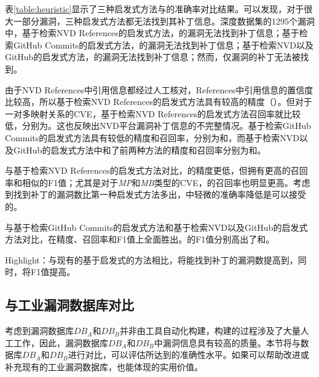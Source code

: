 表\ref{table:heuristic}显示了三种启发式方法与\tool 的准确率对比结果。可以发现，对于很大一部分漏洞，三种启发式方法都无法找到其补丁信息。深度数据集的1295个漏洞中，基于检索NVD References的启发式方法，的漏洞无法找到补丁信息；基于检索GitHub Commits的启发式方法，的漏洞无法找到补丁信息；基于检索NVD以及GitHub的启发式方法，的漏洞无法找到补丁信息；然而，仅漏洞的补丁无法被\tool 找到。

由于NVD References中引用信息都经过人工核对，References中引用信息的置信度比较高，所以基于检索NVD References的启发式方法具有较高的精度（）。但对于一对多映射关系的CVE，基于检索NVD References的启发式方法召回率就比较低，分别为。这也反映出NVD平台漏洞补丁信息的不完整情况。基于检索GitHub Commits的启发式方法具有较低的精度和召回率，分别为和，而基于检索NVD以及GitHub的启发式方法中和了前两种方法的精度和召回率分别为和。

与基于检索NVD References的启发式方法对比，\tool 的精度更低，但拥有更高的召回率和相似的F1值；尤其是对于\textit{MP}和\textit{MB}类型的CVE，\tool 的召回率也明显更高。考虑到\tool 找到补丁的漏洞数比第一种启发式方法多出，\tool 中轻微的准确率降低是可以接受的。

与基于检索GitHub Commits的启发式方法和基于检索NVD以及GitHub的启发式方法对比，\tool 在精度、召回率和F1值上全面胜出。\tool 的F1值分别高出了和。

\begin{tcolorbox}[size=title,opacityfill=0.15]
Highlight：与现有的基于启发式的方法相比，\tool 将能找到补丁的漏洞数提高到，同时，将F1值提高。
\end{tcolorbox}


\subsection{与工业漏洞数据库对比}

考虑到漏洞数据库$DB_A$和$DB_B$并非由工具自动化构建，构建的过程涉及了大量人工工作，因此，漏洞数据库$DB_A$和$DB_B$中漏洞信息具有较高的质量。本节将\tool 与数据库$DB_A$和$DB_B$进行对比，可以评估\tool 所达到的准确性水平。如果\tool 可以帮助改进或补充现有的工业漏洞数据库，也能体现\tool 的实用价值。

